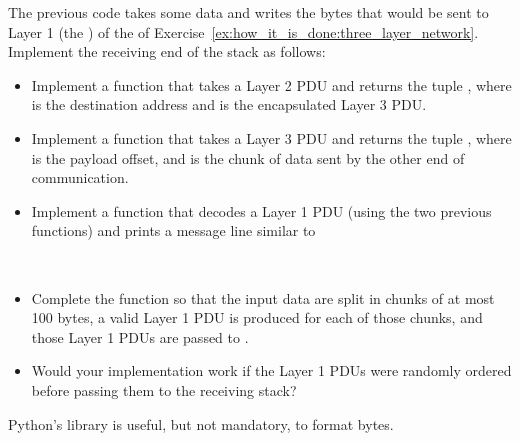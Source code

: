 \begin{center}
\end{center}

\begin{exercise}
The previous code takes some data and writes the bytes that would be sent to Layer 1 
(the ) of the  of Exercise~\ref{ex:how_it_is_done:three_layer_network}.
Implement the receiving end of the stack as follows: 

\begin{itemize}
\item Implement a  function that takes a Layer 2 PDU
  and returns the tuple , where  is the destination address and 
   is the encapsulated Layer 3 PDU.\\[-0.25cm]
  
\item Implement a  function that takes a Layer 3 PDU
  and returns the tuple , where  is the payload offset, and 
   is the chunk of data sent by the other end of communication.\\[-0.25cm]
  
\item Implement a  function that decodes a Layer 1 PDU (using the two previous functions)
  and prints a message line similar to 
  \begin{center}
  \end{center}\ \\[-0.75cm]
  
\item Complete the  function so that the input data are split in chunks of at most 100 bytes, 
      a valid Layer 1 PDU is produced for each of those chunks,
      and those Layer 1 PDUs are passed to .\\[-0.25cm]
      
\item Would your implementation work if the Layer 1 PDUs were randomly ordered before passing them to the receiving stack?
\end{itemize}
% 
\label{ex:how_it_is_done:implementation_three_layer_network}
\end{exercise}

\begin{remark}
Python's  library is useful, but not mandatory, to format  bytes.
\end{remark}
